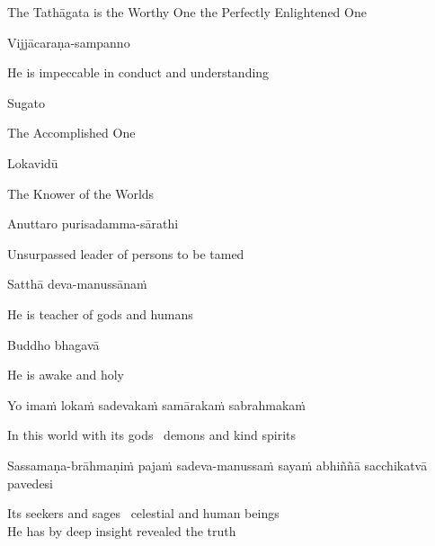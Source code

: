 \begin{english}
  The Tathāgata is the Worthy One the Perfectly Enlightened One
\end{english}

Vijjācaraṇa-sampanno

\begin{english}
  He is impeccable in conduct and understanding
\end{english}

Sugato

\begin{english}
  The Accomplished One
\end{english}

Lokavidū

\begin{english}
  The Knower of the Worlds
\end{english}

Anuttaro purisadamma-sārathi

\begin{english}
  Unsurpassed leader of persons to be tamed\makeatletter\hyperlink{endnote3-appendix}\makeatother
\end{english}

Satthā deva-manussānaṁ

\begin{english}
  He is teacher of gods and humans
\end{english}

Buddho bhagavā

\begin{english}
  He is awake and holy
\end{english}

Yo imaṁ lokaṁ sadevakaṁ samārakaṁ sabrahmakaṁ

\begin{english}
  In this world with its gods \breathmark\ demons and kind spirits
\end{english}

\begin{pali-hang}
  Sassamaṇa-brāhmaṇiṁ pajaṁ sadeva-manussaṁ sayaṁ abhiññā sacchikatvā pavedesi
\end{pali-hang}

\begin{english}
  Its seekers and sages \breathmark\ celestial and human beings\\
  He has by deep insight revealed the truth
\end{english}

